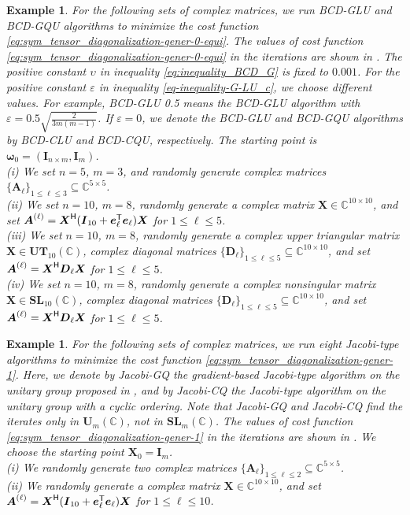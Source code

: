 \documentclass[final,onefignum,onetabnum]{siamart190516}
\newcounter{example}
\newcommand{\matr}[1]{\boldsymbol{#1}}
\newcommand{\vect}[1]{\boldsymbol{#1}}
\newcommand{\T}{{\sf T}} %
\renewcommand{\H}{{\sf H}} %
\newcommand{\CC}{\mathbb{C}}
\newtheorem{example1}[theorem]{Example}
\renewcommand{\H}{{\sf H}}      %
\newcommand{\UNN}[1]{\mathbf{U}_{#1}}
\newcommand{\SL}{\mathbf{SL}}
\newcommand{\UT}{\mathbf{UT}}
\begin{document}
\begin{example1}\label{example-1-1}
For the following sets of complex matrices, 
we run BCD-GLU and BCD-GQU algorithms to minimize the cost function \cref{eq:sym_tensor_diagonalization-gener-0-equi}. 
The values of cost function \cref{eq:sym_tensor_diagonalization-gener-0-equi} in the iterations are shown in . The positive constant $\upsilon$ in inequality \cref{eq:inequality_BCD_G} is fixed to $0.001$. 
For the positive constant $\varepsilon$ in inequality \cref{eq-inequality-G-LU_c}, we choose different values.  
For example, \emph{BCD-GLU 0.5} means the BCD-GLU algorithm with  $\varepsilon=0.5\sqrt{\frac{2}{3m(m-1)}}$. 
If $\varepsilon=0$, we denote the BCD-GLU and BCD-GQU algorithms by BCD-CLU and BCD-CQU, respectively. The starting point is $\matr{\omega}_{0}=(\matr{I}_{n\times m},\matr{I}_{m})$. \\
(i) We set $n=5$, $m=3$, and randomly generate complex matrices $\{\matr{A}_{\ell}\}_{1\leq\ell\leq 3}\subseteq\CC^{5\times 5}$.\\
(ii) We set $n=10$, $m=8$, randomly generate a complex matrix $\matr{X}\in\CC^{10\times 10}$, and set 
$\matr{A}^{(\ell)}=\matr{X}^\H (\matr{I}_{10}+\vect{e}_{\ell}^{\T}\vect{e}_{\ell})\matr{X}$
for $1\leq \ell\leq 5$.\\
(iii) We set $n=10$, $m=8$, randomly generate a complex upper triangular matrix $\matr{X}\in\UT_{10}(\CC)$, complex diagonal matrices  $\{\matr{D}_{\ell}\}_{1\leq\ell\leq 5}\subseteq\CC^{10\times 10}$, and set $\matr{A}^{(\ell)}=\matr{X}^\H \matr{D}_{\ell} \matr{X}$ for $1\leq \ell\leq 5$. \\
(iv) We set $n=10$, $m=8$, randomly generate a complex nonsingular matrix $\matr{X}\in\SL_{10}(\CC)$, complex diagonal matrices  $\{\matr{D}_{\ell}\}_{1\leq\ell\leq 5}\subseteq\CC^{10\times 10}$, and set $\matr{A}^{(\ell)}=\matr{X}^\H \matr{D}_{\ell} \matr{X}$ for $1\leq \ell\leq 5$.
\end{example1} 

\begin{example1}\label{example-1}
For the following sets of complex matrices, 
we run eight Jacobi-type algorithms to minimize the cost function \cref{eq:sym_tensor_diagonalization-gener-1}.
Here, we denote by Jacobi-GQ the gradient-based Jacobi-type algorithm on the unitary group proposed in \cite{ULC2019}, and by Jacobi-CQ the Jacobi-type algorithm on the unitary group with a cyclic ordering. 
Note that Jacobi-GQ and Jacobi-CQ find the iterates only in $\UNN{m}(\CC)$, not in $\SL_m(\CC)$.
The values of cost function \cref{eq:sym_tensor_diagonalization-gener-1} in the iterations are shown in .  
We choose the starting point $\matr{X}_{0}=\matr{I}_{m}$.\\ 
(i) We randomly generate two complex matrices $\{\matr{A}_{\ell}\}_{1\leq\ell\leq 2}\subseteq\CC^{5\times 5}$.\\
(ii) We randomly generate a complex matrix $\matr{X}\in\CC^{10\times 10}$, and set 
$\matr{A}^{(\ell)}=\matr{X}^\H (\matr{I}_{10}+\vect{e}_{\ell}^{\T}\vect{e}_{\ell})\matr{X}$
for $1\leq \ell\leq 10$. 
\end{example1}
\end{document}
